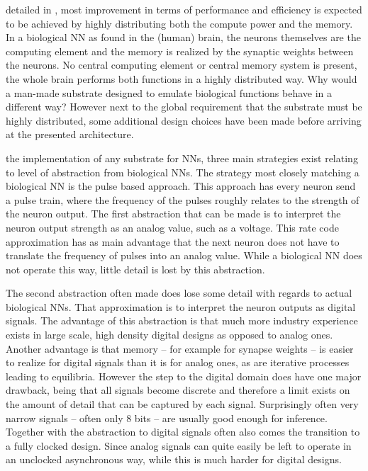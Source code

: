 detailed in , most improvement in terms of performance and efficiency is expected to be achieved by highly distributing both the compute power and the memory. In a biological \ac{NN} as found in the (human) brain, the neurons themselves are the computing element and the memory is realized by the synaptic weights between the neurons.  No central computing element or central memory system is present, the whole brain performs both functions in a highly distributed way. Why would a man-made substrate designed to emulate biological functions behave in a different way? However next to the global requirement that the substrate must be highly distributed, some additional design choices have been made before arriving at the presented architecture.

 the implementation of any substrate for \acp{NN}, three main strategies exist relating to level of abstraction from biological \acp{NN}. The strategy most closely matching a biological \ac{NN} is the pulse based approach. This approach has every neuron send a pulse train, where the frequency of the pulses roughly relates to the strength of the neuron output. The first abstraction that can be made is to interpret the neuron output strength as an analog value, such as a voltage. This rate code approximation has as main advantage that the next neuron does not have to translate the frequency of pulses into an analog value. While a biological \ac{NN} does not operate this way, little detail is lost by this abstraction.

The second abstraction often made does lose some detail with regards to actual biological \acp{NN}. That approximation is to interpret the neuron outputs as digital signals. The advantage of this abstraction is that much more industry experience exists in large scale, high density digital designs as opposed to analog ones. Another advantage is that memory -- for example for synapse weights -- is easier to realize for digital signals than it is for analog ones, as are iterative processes leading to equilibria. However the step to the digital domain does have one major drawback, being that all signals become discrete and therefore a limit exists on the amount of detail that can be captured by each signal. Surprisingly often very narrow signals -- often only 8 bits -- are usually good enough for inference\cite{8192463}. Together with the abstraction to digital signals often also comes the transition to a fully clocked design. Since analog signals can quite easily be left to operate in an unclocked asynchronous way, while this is much harder for digital designs.

